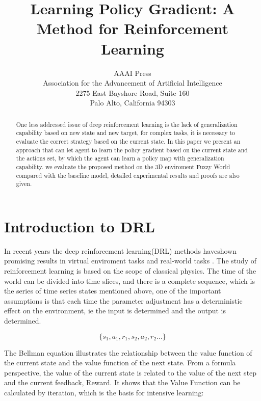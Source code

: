 \documentclass[letterpaper]{article} %
\begin{document}
%
\title{Learning Policy Gradient: A Method for Reinforcement Learning}
\author{AAAI Press\\
Association for the Advancement of Artificial Intelligence\\
2275 East Bayshore Road, Suite 160\\
Palo Alto, California 94303\\
}
\maketitle
\begin{abstract}
One less addressed issue of deep reinforcement learning is the lack of generalization capability based on new state and new target, for complex tasks, it is necessary to evaluate the correct strategy based on the current state. In this paper we present an approach that can let agent to learn the policy gradient based on the current state and the actions set, by which the agent can learn a policy map with generalization capability. we evaluate the proposed method on the 3D enviroment Fuzzy World compared with the baseline model, detailed experimental results and proofs are also given.

\end{abstract}



\section{Introduction to DRL}
In recent years the deep reinforcement learning(DRL) methods haveshown promising results in virtual enviroment tasks and real-world tasks \cite{A1} \cite{A2} \cite{A3}. The study of reinforcement learning is based on the scope of classical physics. The time of the world can be divided into time slices, and there is a complete sequence, which is the series of time series states mentioned above, one of the important assumptions is that each time the parameter adjustment has a deterministic effect on the environment, ie the input is determined and the output is determined.

$$\{s_1,a_1,r_1,s_2,a_2,r_2...\}$$

The Bellman equation \cite{A1} illustrates the relationship between the value function of the current state and the value function of the next state. From a formula perspective, the value of the current state is related to the value of the next step and the current feedback, Reward. It shows that the Value Function can be calculated by iteration, which is the basis for intensive learning:
\end{document}
